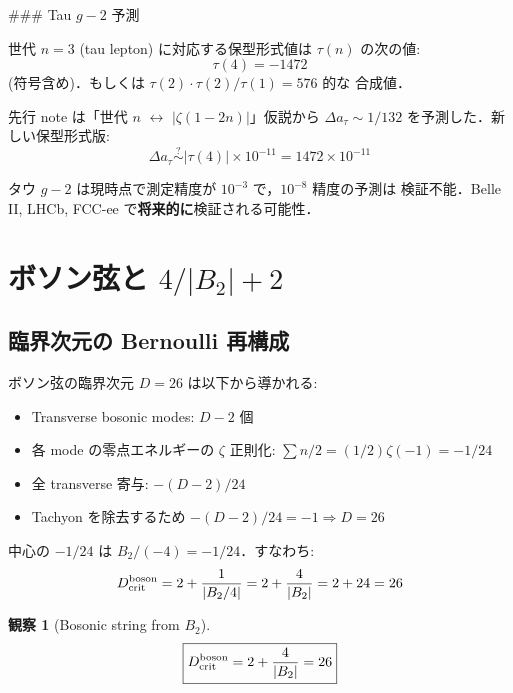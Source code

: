 \documentclass[11pt,a4paper]{article}
\newtheorem{observation}{観察}
\begin{document}
### Tau $g-2$ 予測

世代 $n=3$ (tau lepton) に対応する保型形式値は $\tau(n)$ の次の値:
\begin{equation}
\tau(4) = -1472
\end{equation}
(符号含め)．もしくは $\tau(2) \cdot \tau(2) / \tau(1) = 576$ 的な
合成値．

先行 note は「世代 $n$ $\leftrightarrow$ $|\zeta(1-2n)|$」仮説から
$\Delta a_\tau \sim 1/132$ を予測した．新しい保型形式版:
\begin{equation}
\Delta a_\tau \stackrel{?}{\sim} |\tau(4)| \times 10^{-11} = 1472 \times 10^{-11}
\end{equation}

タウ $g-2$ は現時点で測定精度が $10^{-3}$ で，$10^{-8}$ 精度の予測は
検証不能．Belle II, LHCb, FCC-ee で\textbf{将来的に}検証される可能性．

\section{ボソン弦と $4/|B_2| + 2$}

\subsection{臨界次元の Bernoulli 再構成}

ボソン弦の臨界次元 $D = 26$ は以下から導かれる:
\begin{itemize}
\item Transverse bosonic modes: $D - 2$ 個
\item 各 mode の零点エネルギーの $\zeta$ 正則化: $\sum n/2 = (1/2)\zeta(-1) = -1/24$
\item 全 transverse 寄与: $-(D-2)/24$
\item Tachyon を除去するため $-(D-2)/24 = -1 \Longrightarrow D = 26$
\end{itemize}

中心の $-1/24$ は $B_2/(-4) = -1/24$．すなわち:
\begin{equation}
D_{\rm crit}^{\rm boson} = 2 + \frac{1}{|B_2/4|} = 2 + \frac{4}{|B_2|} = 2 + 24 = 26
\end{equation}

\begin{observation}[Bosonic string from $B_2$]
\begin{equation}
\boxed{D_{\rm crit}^{\rm boson} = 2 + \frac{4}{|B_2|} = 26}
\end{equation}
\end{observation}
\end{document}

